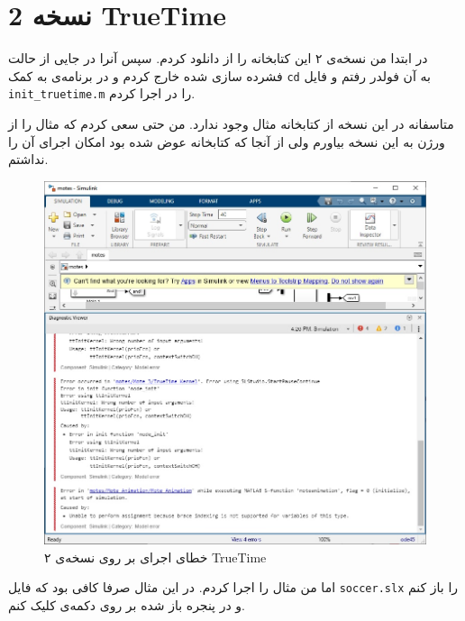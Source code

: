 \documentclass[]{article}
\begin{document}
\section*{نسخه 2 TrueTime}
در ابتدا من نسخه‌ی ۲ این کتابخانه را از
دانلود کردم. سپس آنرا در جایی از حالت فشرده سازی شده خارج کردم و در برنامه‌ی
به کمک
\verb|cd|
به آن فولدر رفتم و فایل
\verb|init_truetime.m|
را در
اجرا کردم.

متاسفانه در این نسخه از کتابخانه مثال
وجود ندارد. من حتی سعی کردم که مثال را از ورژن
به این نسخه بیاورم ولی از آنجا که
کتابخانه عوض شده بود امکان اجرای آن را نداشتم.
\begin{figure}[H]
    \centering
    \includegraphics[scale=0.6]{pics/2-error.jpg}
    \caption{خطای اجرای  بر روی نسخه‌ی ۲ TrueTime}
\end{figure}
اما من مثال
را اجرا کردم. در این مثال صرفا کافی بود که فایل
\verb|soccer.slx|
را باز کنم و در پنجره باز شده بر روی دکمه‌ی
کلیک کنم.
\end{document}
